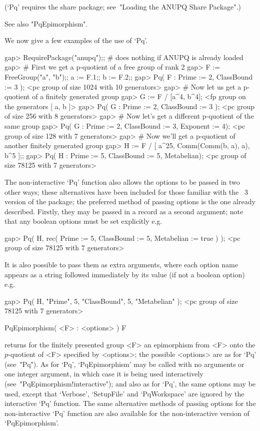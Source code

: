 (`Pq' requires the {\ANUPQ} share package; see~"Loading  the  ANUPQ  Share
Package".)

See also "PqEpimorphism".

We now give a few examples of the use of `Pq'.

\beginexample
gap> RequirePackage("anupq");; # does nothing if ANUPQ is already loaded
gap> # First we get a p-quotient of a free group of rank 2
gap> F := FreeGroup("a", "b");; a := F.1;; b := F.2;;
gap> Pq( F : Prime := 2, ClassBound := 3 ); 
<pc group of size 1024 with 10 generators>
gap> # Now let us get a p-quotient of a finitely generated group
gap> G := F / [a^4, b^4];
<fp group on the generators [ a, b ]>
gap> Pq( G : Prime := 2, ClassBound := 3 ); 
<pc group of size 256 with 8 generators>
gap> # Now let's get a different p-quotient of the same group
gap> Pq( G : Prime := 2, ClassBound := 3, Exponent := 4); 
<pc group of size 128 with 7 generators>
gap> # Now we'll get a p-quotient of another finitely generated group 
gap> H := F / [ a^25, Comm(Comm(b, a), a), b^5 ];;
gap> Pq( H : Prime := 5, ClassBound := 5, Metabelian);
<pc group of size 78125 with 7 generators>
\endexample

The non-interactive `Pq' function also allows the options to be passed in
two other ways; these alternatives have been included for those  familiar
with the {\GAP}~3 version of the {\ANUPQ} package; the  preferred  method
of passing options is the one already described.  Firstly,  they  may  be
passed in a record as a second argument; note that  any  boolean  options
must be set explicitly e.g.

\beginexample
gap> Pq( H, rec( Prime := 5, ClassBound := 5, Metabelian := true ) );
<pc group of size 78125 with 7 generators>
\endexample

It is also possible to pass them as extra arguments, where each option
name appears as a string followed immediately by its value (if not a
boolean option) e.g.

\beginexample
gap> Pq( H, "Prime", 5, "ClassBound", 5, "Metabelian" );             
<pc group of size 78125 with 7 generators>
\endexample

\>PqEpimorphism( <F> : <options> ) F

returns for the finitely presented group <F> an epimorphism from <F> onto
the $p$-quotient of <F> specified by <options>;  the  possible  <options>
are as for `Pq' (see~"Pq"). As for `Pq', `PqEpimorphism'  may  be  called
with no arguments or one integer argument, in which case it is being used
interactively (see~"PqEpimorphism!interactive"); and also  as  for  `Pq',
the same options may be used,  except  that  `Verbose',  `SetupFile'  and
`PqWorkspace' are ignored by the  interactive  `Pq'  function.  The  same
alternative methods of  passing  options  for  the  non-interactive  `Pq'
function  are  also  available  for  the   non-interactive   version   of
`PqEpimorphism'.

